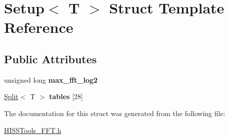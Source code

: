 \hypertarget{struct_setup}{}\section{Setup$<$ T $>$ Struct Template Reference}
\label{struct_setup}
\subsection*{Public Attributes}
\begin{DoxyCompactItemize}
\item 
\mbox{\label{struct_setup_ae072d7f1047b7e5650befe5e990b55a1}} 
unsigned long {\bfseries max\+\_\+fft\+\_\+log2}
\item 
\mbox{\label{struct_setup_a9580671f3822ab800711615f0ee671e6}} 
\hyperlink{struct_split}{Split}$<$ T $>$ {\bfseries tables} \mbox{[}28\mbox{]}
\end{DoxyCompactItemize}


The documentation for this struct was generated from the following file\+:\begin{DoxyCompactItemize}
\item 
\hyperlink{_h_i_s_s_tools___f_f_t_8h}{H\+I\+S\+S\+Tools\+\_\+\+F\+F\+T.\+h}\end{DoxyCompactItemize}
